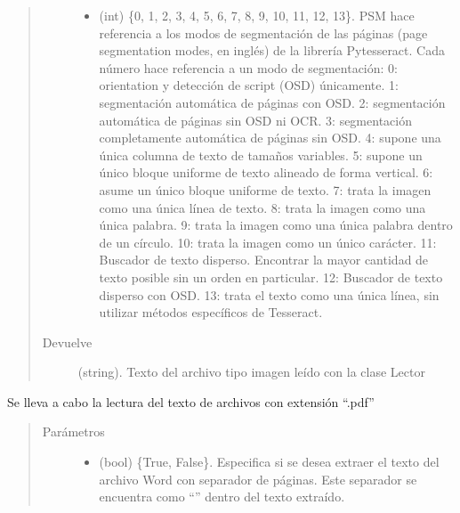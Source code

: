 \documentclass[letterpaper,10pt,openany,spanish]{sphinxmanual}
\begin{document}
\begin{fulllineitems}
\begin{fulllineitems}
\begin{quote}
\begin{description}
\begin{itemize}
\item {} 
 \textendash{} (int) \{0, 1, 2, 3, 4, 5, 6, 7, 8, 9, 10, 11, 12, 13\}. PSM hace referencia a             los modos de segmentación de las páginas (page segmentation modes, en inglés) de la             librería Pytesseract. Cada número hace referencia a un modo de segmentación:               
 0: orientation y detección de script (OSD) únicamente.  
 1: segmentación automática de páginas con OSD.  
 2: segmentación automática de páginas sin OSD ni OCR.  
 3: segmentación completamente automática de páginas sin OSD.  
 4: supone una única columna de texto de tamaños variables.  
 5: supone un único bloque uniforme de texto alineado de forma vertical.  
 6: asume un único bloque uniforme de texto.  
 7: trata la imagen como una única línea de texto.  
 8: trata la imagen como una única palabra.  
 9: trata la imagen como una única palabra dentro de un círculo.  
 10: trata la imagen como un único carácter.  
 11: Buscador de texto disperso. Encontrar la mayor cantidad de texto posible sin un orden en particular.  
 12: Buscador de texto disperso con OSD.  
 13: trata el texto como una única línea, sin utilizar métodos específicos de Tesseract.  


\end{itemize}

\item[{Devuelve}] \leavevmode
(string). Texto del archivo tipo imagen leído con la clase Lector

\end{description}\end{quote}

\end{fulllineitems}


\begin{fulllineitems}
\label{\detokenize{funciones/lectura:lectura.Lector.leer_pdf}}
Se lleva a cabo la lectura del texto de archivos con extensión “.pdf”
\begin{quote}\begin{description}
\item[{Parámetros}] \leavevmode\begin{itemize}
\item {} 
 \textendash{} (bool) \{True, False\}. Especifica si se desea extraer el texto del             archivo Word con separador de páginas. Este separador se encuentra como “”             dentro del texto extraído.


\end{itemize}
\end{description}
\end{quote}
\end{fulllineitems}
\end{fulllineitems}
\end{document}
